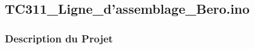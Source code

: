 \documentclass[a4paper,12pt]{report}
\begin{document}
\newpage
\subsection{TC311\_Ligne\_d'assemblage\_Bero.ino}
\begin{center}
\label{}
\end{center}
\subsubsection{Description du Projet}
\end{document}

